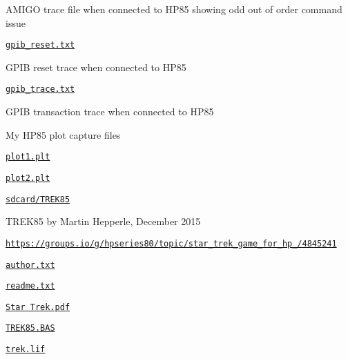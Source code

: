 \begin{DoxyItemize}
\begin{DoxyItemize}
\begin{DoxyItemize}
\begin{DoxyItemize}
\item A\+M\+I\+GO trace file when connected to H\+P85 showing odd out of order command issue
\end{DoxyItemize}
\item \href{sdcard/gpib_reset.txt}{\tt gpib\+\_\+reset.\+txt}
\begin{DoxyItemize}
\item G\+P\+IB reset trace when connected to H\+P85
\end{DoxyItemize}
\item \href{sdcard/gpib_trace.txt}{\tt gpib\+\_\+trace.\+txt}
\begin{DoxyItemize}
\item G\+P\+IB transaction trace when connected to H\+P85
\end{DoxyItemize}
\end{DoxyItemize}
\item My H\+P85 plot capture files
\begin{DoxyItemize}
\item \href{sdcard/plot1.plt}{\tt plot1.\+plt}
\item \href{sdcard/plot2.plt}{\tt plot2.\+plt}
\end{DoxyItemize}
\item \href{sdcard/TREK85}{\tt sdcard/\+T\+R\+E\+K85}
\begin{DoxyItemize}
\item T\+R\+E\+K85 by Martin Hepperle, December 2015
\item \href{https://groups.io/g/hpseries80/topic/star_trek_game_for_hp_85/4845241}{\tt https\+://groups.\+io/g/hpseries80/topic/star\+\_\+trek\+\_\+game\+\_\+for\+\_\+hp\+\_/4845241}
\begin{DoxyItemize}
\item \href{sdcard/TREK85/author.txt}{\tt author.\+txt}
\item \href{sdcrad/TREK85/readme.txt}{\tt readme.\+txt}
\item \href{sdcard/TREK85/Start Trek.pdf}{\tt Star Trek.\+pdf}
\item \href{sdcrad/TREK85/TREK85.BAS}{\tt T\+R\+E\+K85.\+B\+AS}
\item \href{sdcard/TREK85/trek.lif}{\tt trek.\+lif}
\end{DoxyItemize}
\end{DoxyItemize}
\end{DoxyItemize}
\end{DoxyItemize}



 